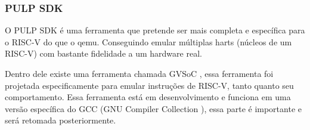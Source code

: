\subsubsection{PULP SDK}

O PULP SDK \cite{PulpSDKRepositorio} é uma ferramenta que pretende ser mais completa e específica para o RISC-V do que o qemu. 
Conseguindo emular múltiplas harts (núcleos de um RISC-V) com bastante fidelidade a um hardware real.

Dentro dele existe uma ferramenta chamada GVSoC \cite{9643828}, essa ferramenta foi projetada especificamente para emular 
instruções de RISC-V, tanto quanto seu comportamento. Essa ferramenta está em desenvolvimento e funciona em uma versão específica do 
GCC (GNU Compiler Collection \cite{GCC}), essa parte é importante e será retomada posteriormente.
